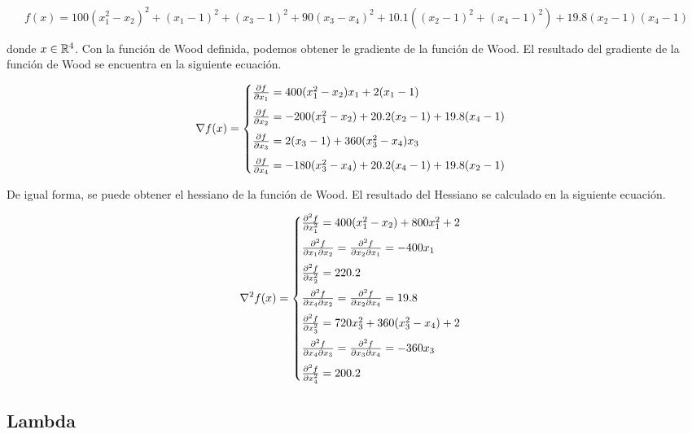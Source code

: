 \changefontsizes{10pt}
\begin{equation}
    f(x) = 100(x_1^2-x_2)^2+(x_1-1)^2+(x_3-1)^2+90(x_3-x_4)^2 +10.1((x_2-1)^2+(x_4-1)^2)+19.8(x_2-1)(x_4-1) \label{eq:wood}
\end{equation}
\normalsize

donde $x\in \mathbb{R}^4$. Con la función de Wood definida, podemos obtener le gradiente de la función de Wood. El resultado del gradiente de la función de Wood se encuentra en la siguiente ecuación.

\begin{equation}
    \nabla f(x) = \begin{cases}
        \frac{\partial f}{\partial x_1}=400(x_1^2-x_2)x_1 +2(x_1-1)             \\[0.25cm]
        \frac{\partial f}{\partial x_2}=-200(x_1^2-x_2)+20.2(x_2-1)+19.8(x_4-1) \\[0.25cm]
        \frac{\partial f}{\partial x_3}=2(x_3-1)+360(x_3^2-x_4)x_3              \\[0.25cm]
        \frac{\partial f}{\partial x_4}=-180(x_3^2-x_4)+20.2(x_4-1)+19.8(x_2-1)
    \end{cases} \label{eq:wood_gradient}
\end{equation}

De igual forma, se puede obtener el hessiano de la función de Wood. El resultado del Hessiano se calculado en la siguiente ecuación.

\begin{equation}
    \nabla^2 f(x) = \begin{cases}
        \frac{\partial^2 f}{\partial x_1^2} = 400(x_1^2-x_2)+800x_1^2+2             \\[0.25cm]
        \frac{\partial^2 f}{\partial x_1 \partial x_2} =\frac{\partial^2 f}{\partial x_2 \partial x_1} = -400x_1 \\[0.25cm]
        \frac{\partial^2 f}{\partial x_2^2} = 220.2                                 \\[0.25cm]
        \frac{\partial^2 f}{\partial x_4 \partial x_2} = \frac{\partial^2 f}{\partial x_2 \partial x_4} = 19.8   \\[0.25cm]
        \frac{\partial^2 f}{\partial x_3^2} = 720x_3^2+360(x_3^2-x_4)+2             \\[0.25cm]
        \frac{\partial^2 f}{\partial x_4 \partial x_3}=\frac{\partial^2 f}{\partial x_3 \partial x_4} = -360x_3  \\[0.25cm]
        \frac{\partial^2 f}{\partial x_4^2} = 200.2
    \end{cases} \label{eq:wood_hessian}
\end{equation}

\subsection*{Lambda}

